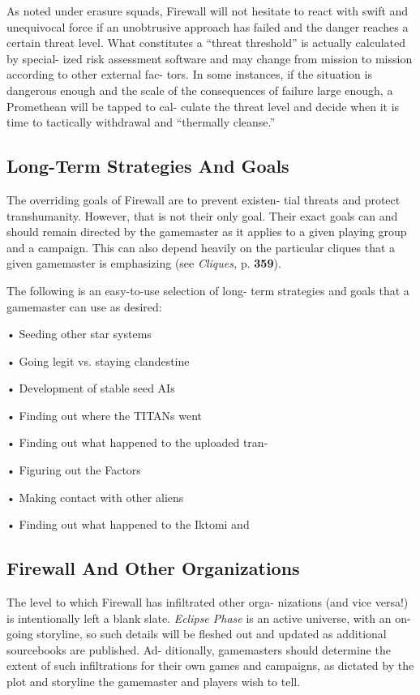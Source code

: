 As noted under erasure squads, Firewall will not 
hesitate to react with swift and unequivocal force if 
an unobtrusive approach has failed and the danger 
reaches a certain threat level. What constitutes a 
``threat threshold'' is actually calculated by special-
ized risk assessment software and may change from 
mission to mission according to other external fac-
tors. In some instances, if the situation is dangerous 
enough and the scale of the consequences of failure 
large enough, a Promethean will be tapped to cal-
culate the threat level and decide when it is time to 
tactically withdrawal and ``thermally cleanse.'' 

\subsection{Long-Term Strategies And Goals }

The overriding goals of Firewall are to prevent existen-
tial threats and protect transhumanity. However, that 
is not their only goal. Their exact goals can and should 
remain directed by the gamemaster as it applies to a 
given playing group and a campaign. This can also 
depend heavily on the particular cliques that a given 
gamemaster is emphasizing (see \textit{Cliques,} p. \textbf{359}). 

The following is an easy-to-use selection of long-
term strategies and goals that a gamemaster can use 
as desired: 

•  Seeding other star systems 

•  Going legit vs. staying clandestine 

•  Development of stable seed AIs 

•  Finding out where the TITANs went 

•  Finding out what happened to the uploaded tran-

•  Figuring out the Factors 

•  Making contact with other aliens 

•  Finding out what happened to the Iktomi and 

\subsection{Firewall And Other Organizations }

The level to which Firewall has infiltrated other orga-
nizations (and vice versa!) is intentionally left a blank 
slate. \textit{Eclipse Phase }is an active universe, with an on-
going storyline, so such details will be fleshed out and 
updated as additional sourcebooks are published. Ad-
ditionally, gamemasters should determine the extent of 
such infiltrations for their own games and campaigns, 
as dictated by the plot and storyline the gamemaster 
and players wish to tell. 

